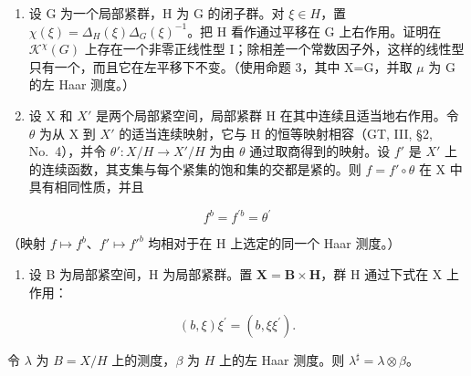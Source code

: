 \exercisesection{}

\begin{enumerate}
\def\labelenumi{\arabic{enumi})}
\item
  设 G 为一个局部紧群，H 为 G 的闭子群。对 \(\xi\in H\)，置 \(\chi(\xi)=\Delta_{H}(\xi)\Delta_{G}(\xi)^{-1}\)。把 H 看作通过平移在 G 上右作用。证明在 \(\mathcal{K}^{\chi}(G)\) 上存在一个非零正线性型 I；除相差一个常数因子外，这样的线性型只有一个，而且它在左平移下不变。（使用命题 3，其中 X=G，并取 \(\mu\) 为 G 的左 Haar 测度。）
\item
  设 X 和 \(X'\) 是两个局部紧空间，局部紧群 H 在其中连续且适当地右作用。令 \(\theta\) 为从 X 到 \(X'\) 的适当连续映射，它与 H 的恒等映射相容（GT, III, §2, No.~4），并令 \(\theta': X/H \to X'/H\) 为由 \(\theta\) 通过取商得到的映射。设 \(f'\) 是 \(X'\) 上的连续函数，其支集与每个紧集的饱和集的交都是紧的。则 \(f = f' \circ \theta\) 在 X 中具有相同性质，并且
\end{enumerate}

\[
f ^ {b} = f ^ {\prime b} = \theta^ {\prime}
\]

（映射 \(f \mapsto f^b\)、\(f' \mapsto f'^b\) 均相对于在 H 上选定的同一个 Haar 测度。）

\begin{enumerate}
\def\labelenumi{\arabic{enumi})}
\setcounter{enumi}{2}
\tightlist
\item
  设 B 为局部紧空间，H 为局部紧群。置 \(\mathbf{X} = \mathbf{B} \times \mathbf{H}\)，群 H 通过下式在 X 上作用：
\end{enumerate}

\[
(b, \xi) \xi^ {\prime} = (b, \xi \xi^ {\prime}).
\]

令 \(\lambda\) 为 \(B = X / H\) 上的测度，\(\beta\) 为 \(H\) 上的左 Haar 测度。则 \(\lambda^{\sharp} = \lambda \otimes \beta\)。

